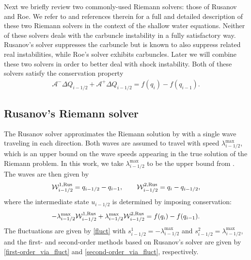 \documentclass[preprint, 11pt]{article}
\newcommand{\W}{{\mathcal W}}
\newcommand{\A}{{\mathcal A}}
\newcommand{\apdq}{\A^+ \!\!{\Delta} Q}
\newcommand{\amdq}{\A^- \!\!{\Delta} Q}
\newcommand{\imh}{{i-1/2}}
\newcommand{\bff}{{f}}
\newcommand{\bfu}{{u}}
\newcommand{\bfq}{{q}}
\newcommand{\Rus}{{\rm Rus}}
\begin{document}
Next we briefly review two commonly-used Riemann solvers: those of Rusanov and
Roe.  We refer to \cite{ketcheson2020riemann} and references therein for
a full and detailed description of these two Riemann solvers in the context of
the shallow water equations.
Neither of these solvers deals with the carbuncle instability in a fully
satisfactory way.  Rusanov's solver suppresses the carbuncle but is known to
also suppress related real instabilities, while Roe's solver exhibits carbuncles.
Later we will combine these two solvers in order to better deal with shock instability.
Both of these solvers satisfy the conservation property
\begin{align} \label{rs_conservation}
    \amdq_\imh + \apdq_\imh = \bff(\bfq_i) - \bff(\bfq_{i-1}).
\end{align}


\subsection{Rusanov's Riemann solver}\label{sec:rusanov}
The Rusanov solver approximates the Riemann solution by with a single wave traveling in each
direction.  Both waves are assumed to travel with speed $\lambda^{\max}_\imh$, which is an
upper bound on the wave speeds appearing in the true solution of the Riemann problem.
In this work, we take $\lambda_{i-1/2}^{\max}$ to be the upper bound
from \cite[Prop. 3.7]{azerad2017well}.
The waves are then given by
\begin{align}\label{rusanov_waves}
  \W_{i-1/2}^{1,\Rus}=\bfq_{i-1/2}-\bfq_{i-1}, \qquad
  \W_{i-1/2}^{2,\Rus}=\bfq_{i}-\bfq_{i-1/2},
\end{align}
where the intermediate state $\bfu_{i-1/2}$ is determined by imposing conservation:
\begin{align}\label{rus_cons}
  -\lambda_{i-1/2}^{\max}\W_{i-1/2}^{1,\Rus}+\lambda_{i-1/2}^{\max}\W_{i-1/2}^{2,\Rus} = \bff(\bfq_{i})-\bff(\bfq_{i-1}).
\end{align}
The fluctuations are given by \eqref{fluct} with $s_{i-1/2}^1=-\lambda_{i-1/2}^{\max}$
and $s_{i-1/2}^2=\lambda_{i-1/2}^{\max}$, and the first- and second-order methods based
on Rusanov's solver are given by \eqref{first-order_via_fluct} and \eqref{second-order_via_fluct}, respectively.
\end{document}
